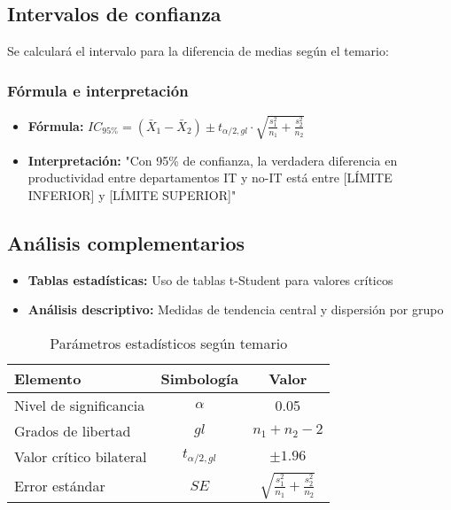 	\subsection{Intervalos de confianza}
	Se calculará el intervalo para la diferencia de medias según el temario:

		\subsubsection*{Fórmula e interpretación}
		\begin{itemize}
			\item \textbf{Fórmula:} $IC_{95\%} = (\bar{X}_1 - \bar{X}_2) \pm t_{\alpha/2, gl} \cdot \sqrt{\frac{s_1^2}{n_1} + \frac{s_2^2}{n_2}}$
			\item \textbf{Interpretación:} "Con 95\% de confianza, la verdadera diferencia en productividad entre departamentos IT y no-IT está entre [LÍMITE INFERIOR] y [LÍMITE SUPERIOR]"
		\end{itemize}

	\subsection{Análisis complementarios}
	\begin{itemize}
		\item \textbf{Tablas estadísticas:} Uso de tablas t-Student para valores críticos
		\item \textbf{Análisis descriptivo:} Medidas de tendencia central y dispersión por grupo
	\end{itemize}

	\begin{table}[H]
		\centering
		\begin{tabular}{|l|c|c|}
		\hline
		\textbf{Elemento} & \textbf{Simbología} & \textbf{Valor} \\ \hline
		Nivel de significancia & $\alpha$ & 0.05 \\ \hline
		Grados de libertad & $gl$ & $n_1 + n_2 - 2$ \\ \hline
		Valor crítico bilateral & $t_{\alpha/2, gl}$ & $\pm 1.96$ \\ \hline
		Error estándar & $SE$ & $\sqrt{\frac{s_1^2}{n_1} + \frac{s_2^2}{n_2}}$ \\ \hline
		\end{tabular}
		\caption{Parámetros estadísticos según temario}
	\end{table}